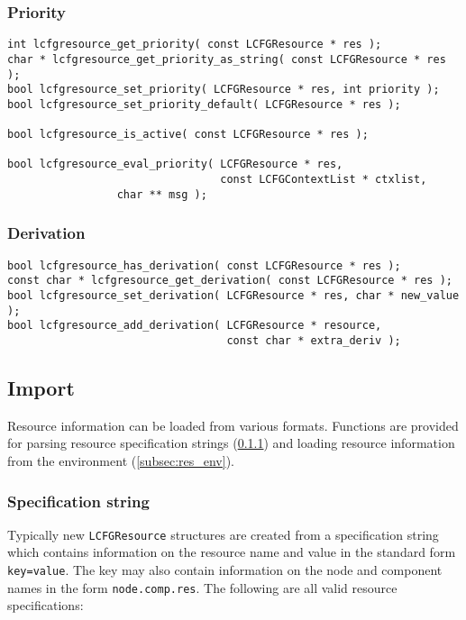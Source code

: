 \documentclass[11pt,a4paper,titlepage]{article}
\begin{document}
\subsubsection{Priority}
\label{subsec:res_priority}

\begin{verbatim}
int lcfgresource_get_priority( const LCFGResource * res );
char * lcfgresource_get_priority_as_string( const LCFGResource * res );
bool lcfgresource_set_priority( LCFGResource * res, int priority );
bool lcfgresource_set_priority_default( LCFGResource * res );

bool lcfgresource_is_active( const LCFGResource * res );

bool lcfgresource_eval_priority( LCFGResource * res,
                                 const LCFGContextList * ctxlist,
				 char ** msg );
\end{verbatim}

\subsubsection{Derivation}
\label{subsec:res_derivation}

\begin{verbatim}
bool lcfgresource_has_derivation( const LCFGResource * res );
const char * lcfgresource_get_derivation( const LCFGResource * res );
bool lcfgresource_set_derivation( LCFGResource * res, char * new_value );
bool lcfgresource_add_derivation( LCFGResource * resource,
                                  const char * extra_deriv );
\end{verbatim}

\subsection{Import}

Resource information can be loaded from various formats. Functions are
provided for parsing resource specification strings
(\ref{subsec:res_spec}) and loading resource information from the
environment (\ref{subsec:res_env}).

\subsubsection{Specification string}
\label{subsec:res_spec}

Typically new \texttt{LCFGResource} structures are created from a
specification string which contains information on the resource name
and value in the standard form \texttt{key=value}. The key may also
contain information on the node and component names in the form
\texttt{node.comp.res}. The following are all valid resource
specifications:
\end{document}
